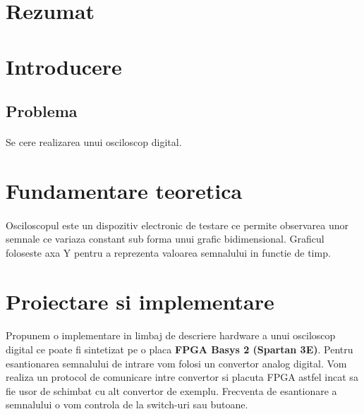 \documentclass[10pt,a4paper]{article}
\begin{document}




\tableofcontents

\clearpage

\section{Rezumat}
\clearpage

\section{Introducere}

\subsection{Problema}
\paragraph{}
Se cere realizarea unui osciloscop digital.

\section{Fundamentare teoretica}
\paragraph{}
Osciloscopul este un dispozitiv electronic de testare ce permite 
observarea unor semnale ce variaza constant sub forma unui grafic bidimensional.
Graficul foloseste axa Y pentru a reprezenta valoarea semnalului in functie de timp.

\section{Proiectare si implementare}
\paragraph{}
Propunem o implementare in limbaj de descriere hardware a unui osciloscop digital ce poate fi sintetizat pe o placa \textbf{FPGA Basys 2 (Spartan 3E)}. Pentru esantionarea semnalului de intrare vom folosi un convertor analog digital. Vom realiza un protocol de comunicare intre convertor si placuta FPGA astfel incat sa fie usor de schimbat cu alt convertor de exemplu. Frecventa de esantionare a semnalului o vom controla de la switch-uri sau butoane. 
\end{document}
